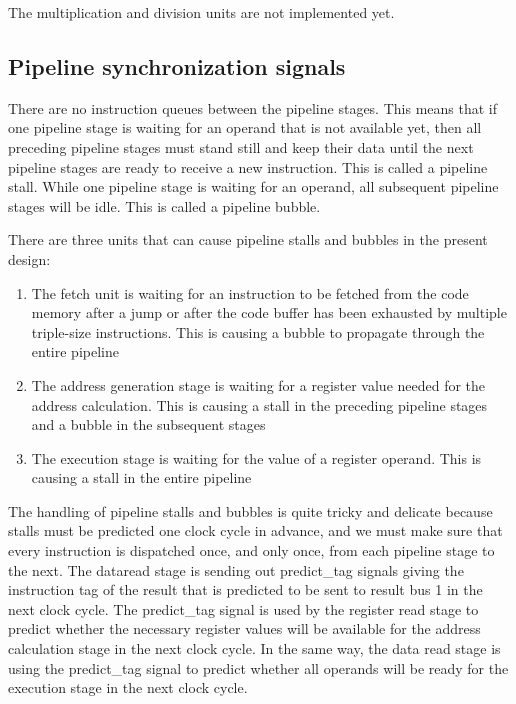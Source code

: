 \documentclass[11pt,a4paper,oneside,openright]{report}
\newcommand{\vv}{ \vspace{2mm} }   %
\begin{document}
The multiplication and division units are not implemented yet.
\vv


\subsection{Pipeline synchronization signals}
There are no instruction queues between the pipeline stages. This means that if one pipeline stage is waiting for an operand that is not available yet, then all preceding pipeline stages must stand still and keep their data until the next pipeline stages are ready to receive a new instruction. This is called a pipeline stall. While one pipeline stage is waiting for an operand, all subsequent pipeline stages will be idle. This is called a pipeline bubble.
\vv

There are three units that can cause pipeline stalls and bubbles in the present design:
\vv

\begin{enumerate}
\item The fetch unit is waiting for an instruction to be fetched from the code memory after a jump or after the code buffer has been exhausted by multiple triple-size instructions. This is causing a bubble to propagate through the entire pipeline
\item The address generation stage is waiting for a register value needed for the address calculation. This is causing a stall in the preceding pipeline stages and a bubble in the subsequent stages
\item The execution stage is waiting for the value of a register operand. This is causing a stall in the entire pipeline
\end{enumerate}
\vv

The handling of pipeline stalls and bubbles is quite tricky and delicate because stalls must be predicted one clock cycle in advance, and we must make sure that every instruction is dispatched once, and only once, from each pipeline stage to the next. The dataread stage is sending out predict\_tag signals giving the instruction tag of the result that is predicted to be sent to result bus 1 in the next clock cycle. The predict\_tag signal is used by the register read stage to predict whether the necessary register values will be available for the address calculation stage in the next clock cycle. In the same way, the data read stage is using the predict\_tag signal to predict whether all operands will be ready for the execution stage in the next clock cycle. 
\vv
\end{document}
